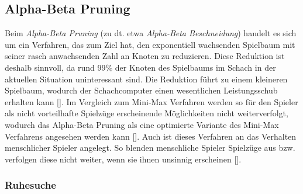 \subsection{Alpha-Beta Pruning} \label{ch:alpha-beta-pruning}

Beim \textit{Alpha-Beta Pruning} (zu dt. etwa \textit{Alpha-Beta Beschneidung}) handelt es sich um ein Verfahren, das zum Ziel hat, den exponentiell wachsenden Spielbaum mit seiner rasch anwachsenden Zahl an Knoten zu reduzieren.
Diese Reduktion ist deshalb sinnvoll, da rund 99\% der Knoten des Spielbaums im Schach in der aktuellen Situation uninteressant sind.
Die Reduktion führt zu einem kleineren Spielbaum, wodurch der Schachcomputer einen wesentlichen Leistungsschub erhalten kann [\cite{Paulsen2009}].
Im Vergleich zum Mini-Max Verfahren werden so für den Spieler als nicht vorteilhafte Spielzüge erscheinende Möglichkeiten nicht weiterverfolgt, wodurch das Alpha-Beta Pruning als eine optimierte Variante des Mini-Max Verfahrens angesehen werden kann [\cite{Knuth1975}].
Auch ist dieses Verfahren an das Verhalten menschlicher Spieler angelegt.
So blenden menschliche Spieler Spielzüge aus bzw. verfolgen diese nicht weiter, wenn sie ihnen unsinnig erscheinen [\cite{Paulsen2009}].


\subsubsection{Ruhesuche}

